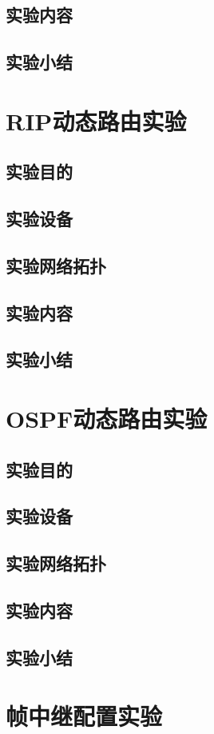 \documentclass[lang=cn,11pt,a4paper,cite=authoryear]{elegantpaper}
\begin{document}
\subsection{实验内容}
\subsection{实验小结}
\section{RIP动态路由实验}
\subsection{实验目的}
\subsection{实验设备}
\subsection{实验网络拓扑}
\subsection{实验内容}
\subsection{实验小结}
\section{OSPF动态路由实验}
\subsection{实验目的}
\subsection{实验设备}
\subsection{实验网络拓扑}
\subsection{实验内容}
\subsection{实验小结}
\section{帧中继配置实验}
\end{document}
